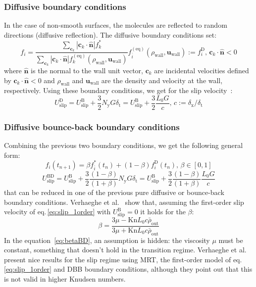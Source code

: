 \subsubsection{Diffusive boundary conditions}
In the case of non-smooth surfaces, the molecules are reflected to random directions
(diffusive reflection). The diffusive boundary conditions set:
\begin{equation}
 f_i = \frac{\sum_{\mathbf{c}_k} | \mathbf{c}_k \cdot \hat{\mathbf{n}}| f_k^* }
 { \sum_{\mathbf{c}_k} | \mathbf{c}_k \cdot \hat{\mathbf{n}} | f_k^\mathrm{(eq)}(\rho_\mathrm{wall}, \mathbf{u}_\mathrm{wall})  }
 f_{\bar{i}}^{\mathrm{(eq)}}(\rho_\mathrm{wall}, \mathbf{u}_\mathrm{wall}) := f_i^\mathrm{D} \textrm{, \ } \mathbf{c}_k \cdot \hat{\mathbf{n}} < 0
\end{equation}
where $\hat{\mathbf{n}}$ is the normal to the wall unit vector, $\mathbf{c}_k$ are incidental velocities 
defined by $ \mathbf{c}_k \cdot \hat{\mathbf{n}} < 0$ and $\rho_\mathrm{wall}$ and $\mathbf{u}_\mathrm{wall}$ are the density
and velocity at the wall, respectively. Using these boundary conditions, we get for the slip velocity~\cite{Verhaeghe2009}:
\begin{equation}
 U_\mathrm{slip}^\mathrm{D} = U_\mathrm{slip}^\mathrm{B} + \frac{3}{2}N_\mathrm{y} G \delta_\mathrm{t} = U_\mathrm{slip}^\mathrm{B} + \frac{3}{2} \frac{L_0 G}{c} \textrm{, \ } c:=\delta_\mathrm{x} / \delta_\mathrm{t}
\end{equation}

\subsubsection{Diffusive bounce-back boundary conditions}
Combining the previous two boundary conditions, we get the following general form:
\begin{equation}
 f_i(t_{n+1}) = \beta f_{\bar{i}}^{*} (t_n) + (1-\beta)f_i^\mathrm{D}(t_n) \textrm{, \ } \beta \in [0,1]
\end{equation}
\begin{equation}
 U_\mathrm{slip}^\mathrm{BD} = U_\mathrm{slip}^\mathrm{B} + \frac{3}{2} \frac{(1-\beta)}{(1+\beta)} N_\mathrm{y} G \delta_\mathrm{t}
 = U_\mathrm{slip}^\mathrm{B} + \frac{3}{2} \frac{(1-\beta)}{(1+\beta)} \frac{L_0 G}{c}
\end{equation}
that can be reduced in one of the previous pure diffusive or bounce-back boundary conditions.
Verhaeghe et al.~\cite{Verhaeghe2009} show that, assuming the first-order slip velocity of eq.\,\ref{eq:slip_1order} with $U_\mathrm{slip}^\mathrm{B} = 0$ 
it holds for the $\beta$:
\begin{equation}
 \beta = \frac{3\mu - \mathrm{Kn} L_0 c \bar{\rho}_\mathrm{out} }{3\mu + \mathrm{Kn} L_0 c \bar{\rho}_\mathrm{out} }
 \label{eq:betaBD}
\end{equation}
In the equation~\ref{eq:betaBD}, an assumption is hidden: the viscosity $\mu$ must be constant, something that
doesn't hold in the transition regime. 
Verhaeghe et al. present nice results for the slip regime using MRT, the first-order model of eq.\,\ref{eq:slip_1order} and DBB boundary conditions, although
they point out that this is not valid in higher Knudsen numbers.

